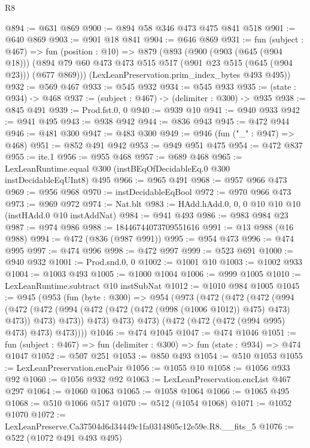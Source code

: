 \begin{lexlean}{R8}
\begin{coremodule}
@894 := @631 @869
@900 := @894 @58 @346 @473 @475 @841 @518
@901 := @640 @869
@903 := @901 @18 @841
@904 := @646 @869
@931 := fun (subject : @467) =>
  fun (position : @10) =>
  @879
    (@893
      (@900
        (@903 (@645 (@904 @18)))
        (@894 @79 @60 @473 @473 @515 @517 (@901 @23 @515 (@645 (@904 @23))) (@677 @869)))
      (LexLeanPreservation.prim_index_bytes @493 @495))
@932 := @569 @467
@933 := @545 @932
@934 := @545 @933
@935 := (state : @934) -> @468
@937 := (subject : @467) -> (delimiter : @300) -> @935
@938 := @845 @491
@939 := Prod.fst.{0, 0}
@940 := @939 @10
@941 := @940 @933
@942 := @941 @495
@943 := @938 @942
@944 := @836 @943
@945 := @472 @944
@946 := @481 @300
@947 := @483 @300
@949 := @946 (fun ("_" : @947) => @468)
@951 := @852 @491 @942
@953 := @949 @951 @475
@954 := @472 @837
@955 := ite.{1}
@956 := @955 @468
@957 := @689 @468
@965 := LexLeanRuntime.equal @300 (instBEqOfDecidableEq.{0} @300 instDecidableEqUInt8) @495
@966 := @965 @491
@968 := @957 @966 @473
@969 := @956 @968
@970 := instDecidableEqBool
@972 := @970 @966 @473
@973 := @969 @972
@974 := Nat.blt
@983 := HAdd.hAdd.{0, 0, 0} @10 @10 @10 (instHAdd.{0} @10 instAddNat)
@984 := @941 @493
@986 := @983 @984 @23
@987 := @974 @986
@988 := 18446744073709551616
@991 := @13 @988 (@16 @988)
@994 := @472 (@836 (@987 @991))
@995 := @954 @473
@996 := @474 @995
@997 := @474 @996
@998 := @472 @997
@999 := @523 @691
@1000 := @940 @932
@1001 := Prod.snd.{0, 0}
@1002 := @1001 @10
@1003 := @1002 @933
@1004 := @1003 @493
@1005 := @1000 @1004
@1006 := @999 @1005
@1010 := LexLeanRuntime.subtract @10 instSubNat
@1012 := @1010 @984 @1005
@1045 := @945
    (@953
      (fun (byte : @300) =>
      @954
        (@973
          (@472
            (@472
              (@472
                (@994
                  (@472
                    (@472 (@994 (@472 (@472 (@472 (@998 (@1006 @1012)) @475) @473) @473)) @473)
                    @473))
                @473)
              @473)
            @473)
          (@472 (@472 (@472 (@994 @995) @473) @473) @473))))
@1046 := @474 @1045
@1047 := @474 @1046
@1051 := fun (subject : @467) => fun (delimiter : @300) => fun (state : @934) => @474 @1047
@1052 := @507 @251
@1053 := @850 @493
@1054 := @510 @1053
@1055 := LexLeanPreservation.encPair
@1056 := @1055 @10
@1058 := @1056 @933 @92
@1060 := @1056 @932 @92
@1063 := LexLeanPreservation.encList @467 @297
@1064 := @1060 @1063
@1065 := @1058 @1064
@1066 := @1065 @495
@1068 := @510 @1066 @517
@1070 := @512 (@1054 @1068)
@1071 := @1052 @1070
@1072 := LexLeanPreserve.Ca37504d6d34449c1fa0314805c12e59e.R8.__fits_5
@1076 := @522 (@1072 @491 @493 @495)

\end{coremodule}
\end{lexlean}
